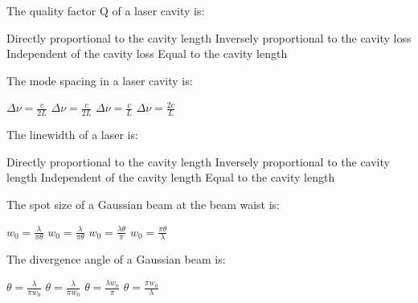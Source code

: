 \begin{question}[2]
The quality factor Q of a laser cavity is:

\begin{oneparcheckboxes}
\choice Directly proportional to the cavity length
\correctchoice Inversely proportional to the cavity loss
\choice Independent of the cavity loss
\choice Equal to the cavity length
\end{oneparcheckboxes}
\end{question}

\begin{question}[2]
The mode spacing in a laser cavity is:

\begin{oneparcheckboxes}
\choice $\displaystyle \Delta\nu = \frac{c}{2L}$
\correctchoice $\displaystyle \Delta\nu = \frac{c}{2L}$
\choice $\displaystyle \Delta\nu = \frac{c}{L}$
\choice $\displaystyle \Delta\nu = \frac{2c}{L}$
\end{oneparcheckboxes}
\end{question}

\begin{question}[2]
The linewidth of a laser is:

\begin{oneparcheckboxes}
\choice Directly proportional to the cavity length
\correctchoice Inversely proportional to the cavity length
\choice Independent of the cavity length
\choice Equal to the cavity length
\end{oneparcheckboxes}
\end{question}

\begin{question}[2]
The spot size of a Gaussian beam at the beam waist is:

\begin{oneparcheckboxes}
\choice $\displaystyle w_0 = \frac{\lambda}{\pi\theta}$
\correctchoice $\displaystyle w_0 = \frac{\lambda}{\pi\theta}$
\choice $\displaystyle w_0 = \frac{\lambda\theta}{\pi}$
\choice $\displaystyle w_0 = \frac{\pi\theta}{\lambda}$
\end{oneparcheckboxes}
\end{question}

\begin{question}[2]
The divergence angle of a Gaussian beam is:

\begin{oneparcheckboxes}
\choice $\displaystyle \theta = \frac{\lambda}{\pi w_0}$
\correctchoice $\displaystyle \theta = \frac{\lambda}{\pi w_0}$
\choice $\displaystyle \theta = \frac{\lambda w_0}{\pi}$
\choice $\displaystyle \theta = \frac{\pi w_0}{\lambda}$
\end{oneparcheckboxes}
\end{question}

